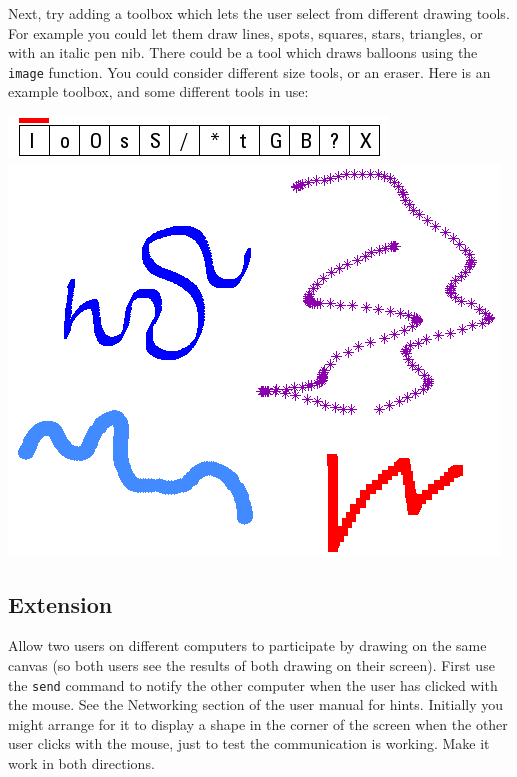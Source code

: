 \documentclass[12pt,a4paper,twoside]{article}
\renewcommand{\_}{\texttt{\symbol{95}}}
\begin{document}
Next, try adding a toolbox which lets the user select from different
drawing tools. For example you could let them draw lines, spots, squares,
stars, triangles, or with an italic pen nib. There could be a tool which
draws balloons using the \verb^image^ function. You could consider
different size tools, or an eraser.
Here is an example toolbox, and some different tools in use:
\begin{center}
\includegraphics[scale=0.6,angle=0]{screenshots/artpixel/paint/toolbox}\\[2mm]
\includegraphics[scale=0.5,angle=0]{screenshots/artpixel/paint/tools}
\end{center}

\subsection{Extension}

Allow two users on different computers to participate
by drawing on the same canvas (so both users see the results of both
drawing on their screen). First use the \verb^send^ command to notify the other
computer when the user has clicked with the mouse. See the Networking section of the user manual for hints.
Initially you might arrange for it to display a shape in the
corner of the screen when the other user clicks with the mouse, just to
test the communication is working. Make it work in both directions.
\end{document}
